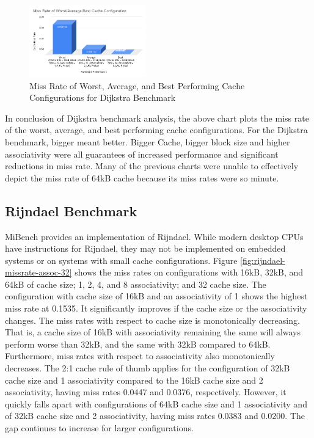 \documentclass[conference]{IEEEtran}
\begin{document}
\begin{figure}[H]
  \centering
  \includegraphics[width=0.45\textwidth]{dijkstraFigures/MissRateofWorstAverageBestCacheConfiguration.png}
  \caption{Miss Rate of Worst, Average, and Best Performing Cache Configurations for Dijkstra Benchmark}
  \label{fig:WorstAvgBest}
\end{figure}

In conclusion of Dijkstra benchmark analysis, the above chart plots the miss rate of the worst, average, and best performing cache configurations. For the Dijkstra benchmark, bigger meant better. Bigger Cache, bigger block size and higher associativity were all guarantees of increased performance and significant reductions in miss rate. Many of the previous charts were unable to effectively depict the miss rate of 64kB cache because its miss rates were so minute.

\subsection{Rijndael Benchmark}

MiBench provides an implementation of Rijndael. While modern desktop CPUs have instructions for Rijndael\cite{gueron2010intel}, they may not be implemented on embedded systems or on systems with small cache configurations. Figure \ref{fig:rijndael-missrate-assoc-32} shows the miss rates on configurations with 16kB, 32kB, and 64kB of cache size; 1, 2, 4, and 8 associativity; and 32 cache size. The configuration with cache size of 16kB and an associativity of 1 shows the highest miss rate at 0.1535. It significantly improves if the cache size or the associativity changes. The miss rates with respect to cache size is monotonically decreasing. That is, a cache size of 16kB with associativity remaining the same will always perform worse than 32kB, and the same with 32kB compared to 64kB. Furthermore, miss rates with respect to associativity also monotonically decreases. The 2:1 cache rule of thumb applies for the configuration of 32kB cache size and 1 associativity compared to the 16kB cache size and 2 associativity, having miss rates 0.0447 and 0.0376, respectively. However, it quickly falls apart with configurations of 64kB cache size and 1 associativity and of 32kB cache size and 2 associativity, having miss rates 0.0383 and 0.0200. The gap continues to increase for larger configurations.
\end{document}

